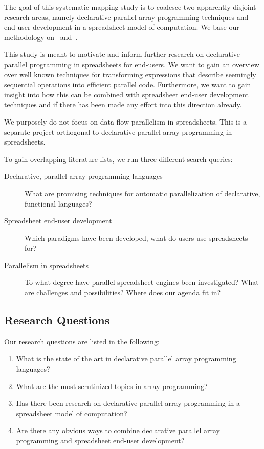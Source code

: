 \documentclass[a4paper]{article}
\begin{document}
The goal of this systematic mapping study is to coalesce two
apparently disjoint research areas, namely declarative parallel array
programming techniques and end-user development in a spreadsheet model
of computation. We base our methodology on~\citet{keele2007guidelines}
and~\citet{petersen2008systematic}.

This study is meant to motivate and inform further research on
declarative parallel programming in spreadsheets for end-users. We
want to gain an overview over well known techniques for transforming
expressions that describe seemingly sequential operations into
efficient parallel code. Furthermore, we want to gain insight into how
this can be combined with spreadsheet end-user development techniques
and if there has been made any effort into this direction
already. 

We purposely do not focus on data-flow parallelism in
spreadsheets. This is a separate project orthogonal to declarative
parallel array programming in spreadsheets.

To gain overlapping literature lists, we run three different search queries:

\begin{description}
\item[Declarative, parallel array programming languages] What are
  promising techniques for automatic parallelization of declarative,
  functional languages?
\item[Spreadsheet end-user development] Which paradigms have been
  developed, what do users use spreadsheets for?
\item[Parallelism in spreadsheets] To what degree have parallel
  spreadsheet engines been investigated? What are challenges and
  possibilities? Where does our agenda fit in?
\end{description}

\subsection{Research Questions}
\label{sec:research-questions}

Our research questions are listed in the following: 

\begin{enumerate}
\item What is the state of the art in declarative parallel array
  programming languages?
\item What are the most scrutinized topics in array programming?
\item Has there been research on declarative parallel array
  programming in a spreadsheet model of computation?
\item Are there any obvious ways to combine declarative parallel array
  programming and spreadsheet end-user development?
\end{enumerate}
\end{document}
